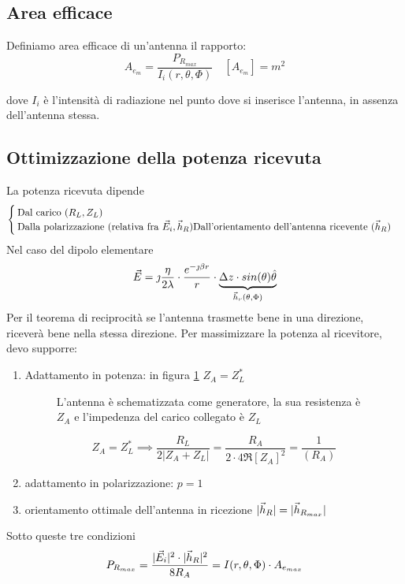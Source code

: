 \subsection{Area efficace}
Definiamo area efficace di un'antenna il rapporto:
\begin{equation}\label{eq:Aeff}
  A_{e_m}=\frac{P_{R_{max}}}{I_i(r,\theta,\Phi)} \quad [A_{e_m}] = m^2
\end{equation}

dove $I_i$ è l'intensità di radiazione nel punto dove si inserisce l'antenna, in assenza dell'antenna stessa.
\subsection{Ottimizzazione della potenza ricevuta}
La potenza ricevuta dipende
\begin{equation}\begin{cases}
  \text{Dal carico $(R_L,Z_L)$} \\
  \text{Dalla polarizzazione (relativa fra $\vec{E}_i,\vec{h}_R$)}
  \text{Dall'orientamento dell'antenna ricevente ($\vec{h}_R$)}
\end{cases}\end{equation}
Nel caso del dipolo elementare
\begin{equation}
  \vec{E} = \jmath \frac{\eta}{2\lambda} \cdot \frac{e^{-\jmath \beta r}}{r} \cdot \underbrace{\Delta z \cdot sin(\theta) \hat{\theta}}_{\vec{h}_r(\theta,\Phi)}
\end{equation}
Per il teorema di reciprocità se l'antenna trasmette bene in una direzione, riceverà bene nella stessa direzione. Per massimizzare la potenza al ricevitore, devo supporre:
\begin{enumerate}
  \item Adattamento in potenza: in figura \ref{fig:antRic} $Z_A=Z_L^*$
    \begin{figure}
      \caption{L'antenna è schematizzata come generatore, la sua resistenza è $Z_A$ e l'impedenza del carico collegato è $Z_L$}
      \label{fig:antRic}
    \end{figure}
    \begin{equation}
      Z_A=Z_L^* \implies \frac{R_L}{2|Z_A+Z_L|} =\frac{R_A}{2 \cdot 4\Re[Z_A]^2 } = \frac{1}{(R_A)}
    \end{equation}
  \item adattamento in polarizzazione: $p=1$
  \item orientamento ottimale dell'antenna in ricezione $|\vec{h}_R|=|\vec{h}_{R_{max}}|$
\end{enumerate}
Sotto queste tre condizioni
\begin{equation}\label{eq:PRmax}
  P_{R_{max}} = \frac{|\vec{E}_i|^2 \cdot |\vec{h}_R|^2}{8 R_A} = I(r,\theta,\Phi)\cdot A_{e_{max}}
\end{equation}

